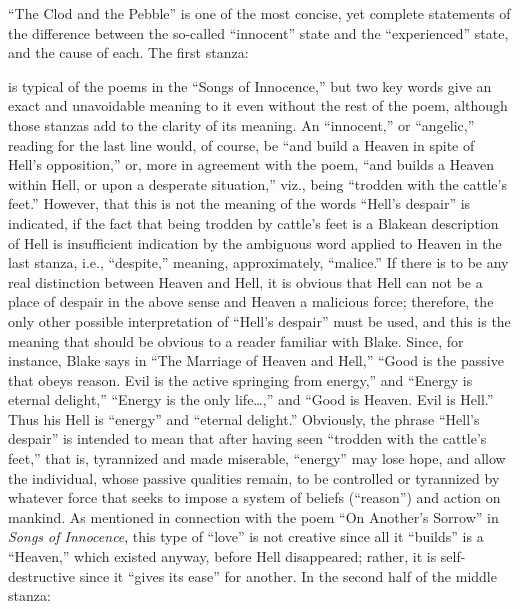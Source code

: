 \enquote{The Clod and the Pebble} is one of the most concise, yet complete statements of the difference between the
so-called \enquote{innocent} state and the \enquote{experienced} state, and the cause of each. The first stanza:


\noindent is typical of the poems in the \enquote{Songs of Innocence,} but two key words give an exact
and unavoidable meaning to it even without the rest of the poem, although those stanzas add to the clarity
of its meaning. An \enquote{innocent,} or \enquote{angelic,} reading for the last line would, of course, be \enquote{and build a Heaven in spite
of Hell's opposition,} or, more in agreement with the poem, \enquote{and builds a Heaven within Hell, or upon a desperate situation,}
viz., being \enquote{trodden with the cattle's feet.} However, that this is not the meaning of the words \enquote{Hell's despair} is
indicated, if the fact that being trodden by cattle's feet is a Blakean description of Hell is insufficient
indication by the ambiguous word applied to Heaven in the last stanza, i.e., \enquote{despite,} meaning, approximately,
\enquote{malice.} If there is to be any real distinction between Heaven and Hell, it is obvious that Hell can not be
a place of despair in the above sense and Heaven a malicious force; therefore, the only other possible interpretation
of \enquote{Hell's despair} must be used, and this is the meaning that should be obvious to a reader familiar with Blake. Since,
for instance, Blake says in \enquote{The Marriage of Heaven and Hell,}\supercite{kazin:portable-blake}
\enquote{Good is the passive that obeys reason. Evil is
the active springing from energy,} and \enquote{Energy is eternal delight,} \enquote{Energy is the only life\dots,} and \enquote{Good is Heaven. Evil is Hell.}
Thus his Hell is \enquote{energy} and \enquote{eternal delight.} Obviously, the phrase \enquote{Hell's despair} is intended to mean
that after having seen \enquote{trodden with the cattle's feet,} that is, tyrannized and made miserable, \enquote{energy} may lose hope, and allow
the individual, whose passive qualities remain, to be controlled or tyrannized by whatever force
that seeks to impose a system of beliefs (\enquote{reason}) and action on mankind. As mentioned in connection
with the poem \enquote{On Another's Sorrow} in \emph{Songs of Innocence}, this type of \enquote{love} is not creative since
all it \enquote{builds} is a \enquote{Heaven,} which existed anyway, before Hell disappeared; rather, it is self-destructive
since it \enquote{gives its ease} for another. In the second half of the middle stanza:

